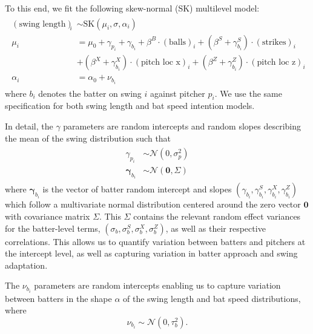 \documentclass[
  12pt]{article}
\begin{document}
    To this end, we fit the following skew-normal (SK) multilevel model:
    \begin{align}
    \label{eqn:intention-swing-length}
    \begin{split}
        ( \mbox{swing length} )_i &\sim \mbox{SK}(\mu_i, \sigma, \alpha_i) \\
        \mu_i &= \mu_0 + \gamma_{p_i} + \gamma_{b_i}
        + \beta^B \cdot (\mbox{balls})_i
          + (\beta^S + \gamma^S_{b_i}) \cdot (\mbox{strikes})_i\\
        & + (\beta^X + \gamma^X_{b_i}) \cdot (\mbox{pitch loc x})_i
          + (\beta^Z + \gamma^Z_{b_i}) \cdot (\mbox{pitch loc z})_i \\
          \alpha_i &= \alpha_0 + \nu_{b_i}
    \end{split}
    \end{align}
    where $b_i$ denotes the batter on swing $i$ against pitcher $p_i$. We use the same specification for both swing length and bat speed intention models. 
    
    In detail, the $\gamma$ parameters are random intercepts and random slopes describing the mean of the swing distribution such that
    \begin{align}
        \begin{split}
            \gamma_{p_i} &\sim \mathcal{N}(0, \sigma^2_p) \\
            \boldsymbol{\gamma}_{b_i} &\sim \mathcal{N}(\boldsymbol{0}, \Sigma)
        \end{split}
    \end{align}
    where $\boldsymbol{\gamma}_{b_i}$ is the vector of batter random intercept and slopes $(\gamma_{b_i}, \gamma^S_{b_i}, \gamma^X_{b_i}, \gamma^Z_{b_i})$ which follow a multivariate normal distribution centered around the zero vector $\boldsymbol{0}$ with covariance matrix $\Sigma$. This $\Sigma$ contains the relevant random effect variances for the batter-level terms, $(\sigma_b, \sigma_b^S, \sigma_b^X, \sigma_b^Z)$, as well as their respective correlations. This allows us to quantify variation between batters and pitchers at the intercept level, as well as capturing variation in batter approach and swing adaptation.
    
    The $\nu_{b_i}$ parameters are random intercepts enabling us to capture variation between batters in the shape $\alpha$ of the swing length and bat speed distributions, where
    \begin{equation}
        \nu_{b_i} \sim \mathcal{N}(0, \tau^2_b).
    \end{equation}
\end{document}
